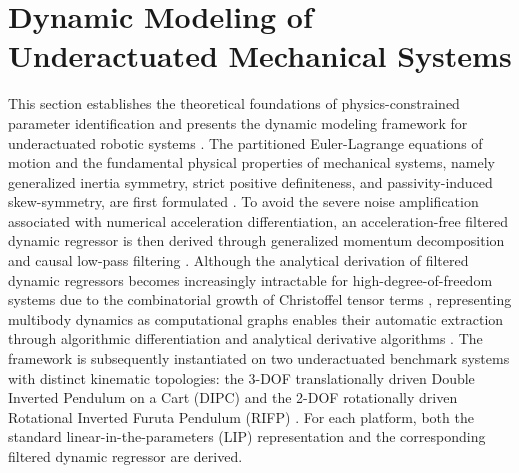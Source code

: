 \documentclass[lettersize,journal]{IEEEtran}
\begin{document}

\section{Dynamic Modeling of Underactuated Mechanical Systems}
\label{sec:dynamics}
This section establishes the theoretical foundations of physics-constrained parameter identification and presents the dynamic modeling framework for underactuated robotic systems \cite{Fantoni2002, Asker2024}. The partitioned Euler-Lagrange equations of motion and the fundamental physical properties of mechanical systems, namely generalized inertia symmetry, strict positive definiteness, and passivity-induced skew-symmetry, are first formulated \cite{Slotine1987, Spong2020, Bargsten2023}. To avoid the severe noise amplification associated with numerical acceleration differentiation, an acceleration-free filtered dynamic regressor is then derived through generalized momentum decomposition and causal low-pass filtering \cite{Reyes1997, GarciaAlarcon2012, AguilarSierra2014}. Although the analytical derivation of filtered dynamic regressors becomes increasingly intractable for high-degree-of-freedom systems due to the combinatorial growth of Christoffel tensor terms \cite{Gautier1990}, representing multibody dynamics as computational graphs enables their automatic extraction through algorithmic differentiation and analytical derivative algorithms \cite{Andersson2019, Carpentier2018, Carpentier2019}. The framework is subsequently instantiated on two underactuated benchmark systems with distinct kinematic topologies: the 3-DOF translationally driven Double Inverted Pendulum on a Cart (DIPC) \cite{Asker2024} and the 2-DOF rotationally driven Rotational Inverted Furuta Pendulum (RIFP) \cite{AguilarSierra2014}. For each platform, both the standard linear-in-the-parameters (LIP) representation and the corresponding filtered dynamic regressor are derived.
\end{document}
